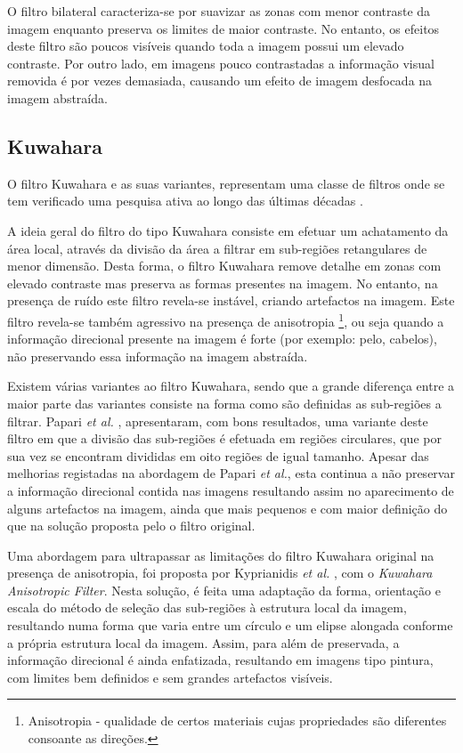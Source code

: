 O filtro bilateral caracteriza-se por suavizar as zonas com menor contraste da imagem enquanto preserva os limites de maior contraste. No entanto, os efeitos deste filtro são poucos visíveis quando toda a imagem possui um elevado contraste. Por outro lado, em imagens pouco contrastadas a informação visual removida é por vezes demasiada, causando um efeito de imagem desfocada na imagem abstraída.

\subsection{Kuwahara}
O filtro Kuwahara e as suas variantes, representam uma classe de filtros onde se tem verificado uma pesquisa ativa ao longo das últimas décadas \cite{Kyprianidis2009}.

A ideia geral do filtro do tipo Kuwahara consiste em efetuar um achatamento da área local, através da divisão da área a filtrar em sub-regiões retangulares de menor dimensão. Desta forma, o filtro Kuwahara remove detalhe em zonas com elevado contraste mas preserva as formas presentes na imagem. No entanto, na presença de ruído este filtro revela-se instável, criando artefactos na imagem. Este filtro revela-se também agressivo na presença de anisotropia \footnote{Anisotropia - qualidade de certos materiais cujas propriedades são diferentes consoante as direções.}, ou seja quando a informação direcional presente na imagem é forte (por exemplo: pelo, cabelos), não preservando essa informação na imagem abstraída.

Existem várias variantes ao filtro Kuwahara, sendo que a grande diferença entre a maior parte das variantes consiste na forma como são definidas as sub-regiões a filtrar. Papari \textit{et al.} \cite{Papari2007}, apresentaram, com bons resultados, uma variante deste filtro em que a divisão das sub-regiões é efetuada em regiões circulares, que por sua vez se encontram divididas em oito regiões de igual tamanho. Apesar das melhorias registadas na abordagem de Papari \textit{et al.}, esta continua a não preservar a informação direcional contida nas imagens resultando assim no aparecimento de alguns artefactos na imagem, ainda que mais pequenos e com maior definição do que na solução proposta pelo o filtro original.

Uma abordagem para ultrapassar as limitações do filtro Kuwahara original na presença de anisotropia, foi proposta por Kyprianidis \textit{et al.} \cite{Kyprianidis2009}, com o \textit{Kuwahara Anisotropic Filter}. Nesta solução, é feita uma adaptação da forma, orientação e escala do  método de seleção das sub-regiões à estrutura local da imagem, resultando numa forma que varia entre um círculo e um elipse alongada conforme a própria estrutura local da imagem. Assim, para além de preservada, a informação direcional é ainda enfatizada, resultando em imagens tipo pintura, com limites bem definidos e sem grandes artefactos visíveis.

